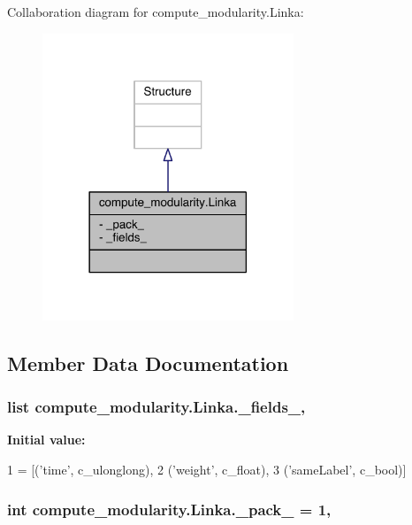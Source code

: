 Collaboration diagram for compute\+\_\+modularity.\+Linka\+:\nopagebreak
\begin{figure}[H]
\begin{center}
\leavevmode
\includegraphics[width=213pt]{classcompute__modularity_1_1_linka__coll__graph}
\end{center}
\end{figure}


\subsection{Member Data Documentation}
\hypertarget{classcompute__modularity_1_1_linka_a3c513154a41c038ac774542380419f38}{
\subsubsection[{\+\_\+fields\+\_\+}]{\setlength{\rightskip}{0pt plus 5cm}list compute\+\_\+modularity.\+Linka.\+\_\+fields\+\_\+\hspace{0.3cm}{\ttfamily [static]}, {\ttfamily [private]}}}\label{classcompute__modularity_1_1_linka_a3c513154a41c038ac774542380419f38}
{\bfseries Initial value\+:}
\begin{DoxyCode}
1 = [(\textcolor{stringliteral}{'time'}, c\_ulonglong),
2                 (\textcolor{stringliteral}{'weight'}, c\_float),
3                 (\textcolor{stringliteral}{'sameLabel'}, c\_bool)]
\end{DoxyCode}
\hypertarget{classcompute__modularity_1_1_linka_aeb6070c463e17d64bbaa4af685a81dad}{
\subsubsection[{\+\_\+pack\+\_\+}]{\setlength{\rightskip}{0pt plus 5cm}int compute\+\_\+modularity.\+Linka.\+\_\+pack\+\_\+ = 1\hspace{0.3cm}{\ttfamily [static]}, {\ttfamily [private]}}}\label{classcompute__modularity_1_1_linka_aeb6070c463e17d64bbaa4af685a81dad}


